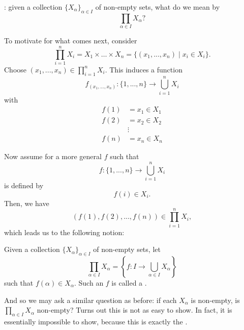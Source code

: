 \documentclass[notoc,notitlepage]{tufte-book}
\begin{document}
: given a collection $\{X_\alpha\}_{\alpha \in I}$ of non-empty sets, what do we mean by
\begin{equation*}
  \prod_{\alpha \in I} X_\alpha ?
\end{equation*}

To motivate for what comes next, consider
\begin{equation*}
  \prod_{i=1}^{n} X_i = X_1 \times \hdots \times X_n = \{ (x_1, ..., x_n) \mid x_i \in X_i \}.
\end{equation*}
Choose $(x_1, ..., x_n) \in \prod\limits_{i=1}^{n} X_i$. This induces a function
\begin{equation*}
  f_{(x_1, ..., x_n)} : \{1, ..., n\} \to \bigcup_{i=1}^{n} X_i
\end{equation*}
with
\begin{align*}
  f(1) &= x_1 \in X_1 \\
  f(2) &= x_2 \in X_2 \\
       &\vdots \\
  f(n) &= x_n \in X_n
\end{align*}

Now assume for a more general $f$ such that
\begin{equation*}
  f: \{1, ..., n\} \to \bigcup_{i=1}^{n} X_i
\end{equation*}
is defined by
\begin{equation*}
  f(i) \in X_i.
\end{equation*}
Then, we have
\begin{equation*}
  ( f(1), f(2), ..., f(n) ) \in \prod_{i=1}^{n} X_i,
\end{equation*}
which leads us to the following notion:

\begin{defn}
\label{defn:choice_function}
  Given a collection $\{X_\alpha\}_{\alpha \in I}$ of non-empty sets, let
  \begin{equation*}
    \prod_{\alpha \in I} X_\alpha = \left\{ f: I \to \bigcup_{\alpha \in I} X_\alpha \right\}
  \end{equation*}
  such that $f(\alpha) \in X_\alpha$. Such an $f$ is called a .
\end{defn}

And so we may ask a similar question as before: if each $X_\alpha$ is non-empty, is $\prod\limits_{\alpha \in I} X_\alpha$ non-empty? Turns out this is not as easy to show. In fact, it is essentially impossible to show, because this is exactly the .
\end{document}
